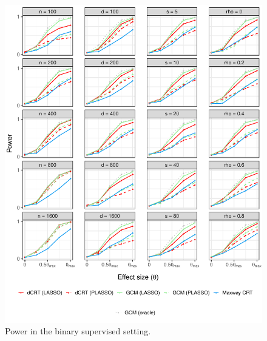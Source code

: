 \documentclass[aos]{imsart}
\theoremstyle{definition}
\theoremstyle{remark}
\begin{document}
\begin{figure}[!ht]
	\centering
	\includegraphics[width = \textwidth]{figures/binomial_supervised_setting_alternative.pdf}
	\caption{Power in the binary supervised setting.}
	\label{fig:binomial_supervised_alternative}
\end{figure}
\end{document}
